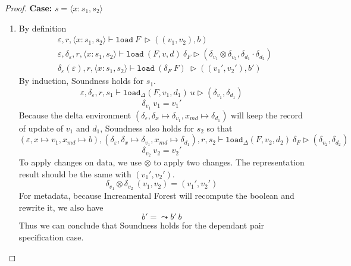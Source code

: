 \documentclass[10pt,twoside,a4paper]{article}
\theoremstyle{theorem}
\theoremstyle{lemma}
\theoremstyle{property}
\theoremstyle{definition}
\theoremstyle{assumption}
\begin{document}
\begin{proof}
	\textbf{Case: } $s = \langle x : s_1, s_2 \rangle$\\
	\begin{enumerate}	
	\item
	By definition
	\begin{align*}
			& \varepsilon, r, \langle x : s_1, s_2 \rangle \vdash \mathtt{load}~ F~ \rhd ((v_1, v_2), b)\\
			& \varepsilon, \delta_\varepsilon, r, \langle x : s_1, s_2 \rangle \vdash \mathtt{load}~ (F,v,d)~ \delta_F \rhd (\delta_{v_1} \otimes \delta_{v_2},\delta_{d_1} \cdot \delta_{d_2})\\
			& \delta_\varepsilon(\varepsilon), r, \langle x : s_1, s_2 \rangle \vdash \mathtt{load}~ (\delta_F~F)~ \rhd ((v_1', v_2'), b')
	\end{align*}
	By induction, Soundness holds for $s_1$.
	\begin{displaymath}
		\varepsilon, \delta_\varepsilon, r, s_1 \vdash \mathtt{load}_\Delta (F,v_1,d_1)~ u \rhd (\delta_{v_1},\delta_{d_1})
	\end{displaymath}
	\begin{displaymath}
		\delta_{v_1} ~v_1 = v_1'
	\end{displaymath}
	Because the delta environment $(\delta_\varepsilon, \delta_x \mapsto \delta_{v_1}, x_{md} \mapsto \delta_{d_1})$ will keep the record of update of $v_1$ and $d_1$, Soundness also holds for $s_2$ so that
	\begin{displaymath}
		(\varepsilon, x \mapsto v_1, x_{md} \mapsto b), (\delta_\varepsilon, \delta_x \mapsto \delta_{v_1}, x_{md} \mapsto \delta_{d_1}), r, s_2 \vdash \mathtt{load}_\Delta (F,v_2,d_2)~ \delta_F \rhd (\delta_{v_2},\delta_{d_2})
	\end{displaymath}
	\begin{displaymath}
		\delta_{v_2} ~v_2 = v_2'
	\end{displaymath}
	To apply changes on data, we use $\otimes$ to apply two changes. The representation result should be the same with $(v_1', v_2')$.
	\begin{displaymath}
		\delta_{v_1} \otimes \delta_{v_2} ~(v_1, v_2) = (v_1', v_2')
	\end{displaymath}
	For metadata, because Increamental Forest will recompute the boolean and rewrite it, we also have
	\begin{displaymath}
		b' = \leadsto b' ~ b
	\end{displaymath}
	Thus we can conclude that Soundness holds for the dependant pair specification case.
	\end{enumerate}


\end{proof}
\end{document}
